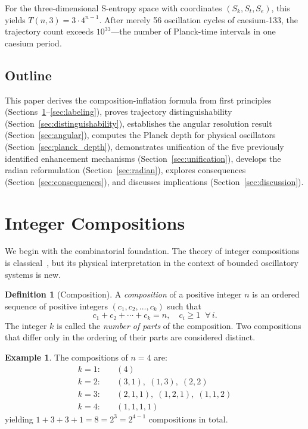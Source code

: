 \documentclass[twocolumn,10pt,a4paper]{article}
\theoremstyle{definition}
\newtheorem{definition}[theorem]{Definition}
\newtheorem{example}[theorem]{Example}
\theoremstyle{remark}
\newcommand{\Sk}{S_k}
\newcommand{\St}{S_t}
\newcommand{\Se}{S_e}
\begin{document}
For the three-dimensional S-entropy space with coordinates $(\Sk, \St, \Se)$, this yields $T(n,3) = 3 \cdot 4^{n-1}$. After merely 56 oscillation cycles of caesium-133, the trajectory count exceeds $10^{33}$---the number of Planck-time intervals in one caesium period.

\subsection{Outline}

This paper derives the composition-inflation formula from first principles (Sections~\ref{sec:compositions}--\ref{sec:labeling}), proves trajectory distinguishability (Section~\ref{sec:distinguishability}), establishes the angular resolution result (Section~\ref{sec:angular}), computes the Planck depth for physical oscillators (Section~\ref{sec:planck_depth}), demonstrates unification of the five previously identified enhancement mechanisms (Section~\ref{sec:unification}), develops the radian reformulation (Section~\ref{sec:radian}), explores consequences (Section~\ref{sec:consequences}), and discusses implications (Section~\ref{sec:discussion}).


\section{Integer Compositions}
\label{sec:compositions}

We begin with the combinatorial foundation. The theory of integer compositions is classical~\cite{andrews1976,heubach2009}, but its physical interpretation in the context of bounded oscillatory systems is new.

\begin{definition}[Composition]
\label{def:composition}
A \emph{composition} of a positive integer $n$ is an ordered sequence of positive integers $(c_1, c_2, \ldots, c_k)$ such that
\begin{equation}
c_1 + c_2 + \cdots + c_k = n, \quad c_i \geq 1 \;\;\forall\, i.
\end{equation}
The integer $k$ is called the \emph{number of parts} of the composition. Two compositions that differ only in the ordering of their parts are considered distinct.
\end{definition}

\begin{example}
The compositions of $n = 4$ are:
\begin{align*}
k=1: &\quad (4) \\
k=2: &\quad (3,1),\; (1,3),\; (2,2) \\
k=3: &\quad (2,1,1),\; (1,2,1),\; (1,1,2) \\
k=4: &\quad (1,1,1,1)
\end{align*}
yielding $1 + 3 + 3 + 1 = 8 = 2^3 = 2^{4-1}$ compositions in total.
\end{example}
\end{document}
